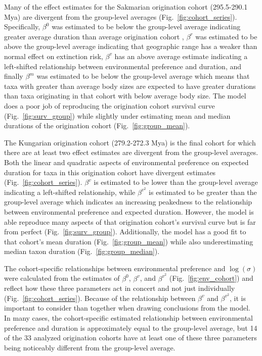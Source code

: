 \documentclass[11pt]{article}
\begin{document}
Many of the effect estimates for the Sakmarian origination cohort (295.5-290.1 Mya) are divergent from the group-level averages (Fig.~\ref{fig:cohort_series}). Specifically, \(\beta^{0}\) was estimated to be below the group-level average indicating greater average duration than average origination cohort , \(\beta^{r}\) was estimated to be above the group-level average indicating that geographic range has a weaker than normal effect on extinction risk, \(\beta^{v}\) has an above average estimate indicating a left-shifted relationship between environmental preference and duration, and finally \(\beta^{m}\) was estimated to be below the group-level average which means that taxa with greater than average body sizes are expected to have greater durations than taxa originating in that cohort with below average body size. The model does a poor job of reproducing the origination cohort survival curve (Fig.~\ref{fig:surv_group}) while slightly under estimating mean and median durations of the origination cohort (Fig.~\ref{fig:group_mean}).

The Kungarian origination cohort (279.2-272.3 Mya) is the final cohort for which there are at least two effect estimates are divergent from the group-level averages. Both the linear and quadratic aspects of environmental preference on expected duration for taxa in this origination cohort have divergent estimates (Fig.~\ref{fig:cohort_series}). \(\beta^{v}\) is estimated to be lower than the group-level average indicating a left-shifted relationship, while \(\beta^{v^{2}}\) is estimated to be greater than the group-level average which indicates an increasing peakedness to the relationship between environmental preference and expected duration. However, the model is able reproduce many aspects of that origination cohort's survival curve but is far from perfect (Fig.~\ref{fig:surv_group}). Additionally, the model has a good fit to that cohort's mean duration (Fig.~\ref{fig:group_mean}) while also underestimating median taxon duration (Fig.~\ref{fig:group_median}).



The cohort-specific relationships between environmental preference and \(\log(\sigma)\) were calculated from the estimates of \(\beta^{0}\), \(\beta^{v}\), and \(\beta^{v^{2}}\) (Fig.~\ref{fig:env_cohort}) and reflect how these three parameters act in concert and not just individually (Fig.~\ref{fig:cohort_series}). Because of the relationship between \(\beta^{v}\) and \(\beta^{v^{2}}\), it is important to consider than together when drawing conclusions from the model. In many cases, the cohort-specific estimated relationship between environmental preference and duration is approximately equal to the group-level average, but 14 of the 33 analyzed origination cohorts have at least one of these three parameters being noticeably different from the group-level average. 
\end{document}
